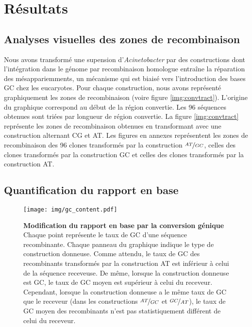 

\section{Résultats}
\label{sec:resultats}

\subsection{Analyses visuelles des zones de recombinaison}
\label{subsec:visu}

Nous avons transformé une supension d'\emph{Acinetobacter} par des constructions
dont l'intégration dans le génome par recombinaison homologue entraîne la
réparation des mésappariemments, un mécanisme qui est biaisé vers l'introduction
des bases GC chez les eucaryotes. Pour chaque construction, nous avons
représenté graphiquement les zones de recombinaison (voire figure
\ref{img:convtract}). L'origine du graphique correspond au début de la région
convertie. Les 96 séquences obtenues sont triées par longueur de région
convertie. La figure \ref{img:convtract} représente les zones de recombinaison
obtenues en transformant avec une construction alternant CG et AT. Les figures
en annexes
représentent les zones de recombinaison des 96 clones transformés par la
construction \(\nicefrac{AT}{GC}\), celles des clones transformés par la
construction GC et celles des clones transformés par la construction AT.


\subsection{Quantification du rapport en base}
\label{subsec:tauxgc}

\begin{figure}
  \texttt{[image: img/gc\_content.pdf]}

  \caption{\textbf{Modification du rapport en base par la
      conversion génique} \\
    Chaque point représente le taux de GC d'une séquence recombinante. Chaque
    panneau du graphique indique le type de construction donneuse. Comme
    attendu, le taux de GC des recombinants transformés par la construction AT
    est inférieur à celui de la séquence receveuse. De même, lorsque la
    construction donneuse est GC, le taux de GC moyen est supérieur à celui du
    receveur. Cependant, lorsque la construction donneuse a le même taux de GC
    que le receveur (dans les constructions $\nicefrac{AT}{GC}$ et
    $\nicefrac{GC}{AT}$), le taux de GC moyen des recombinants n'est pas
    statistiquement différent de celui du receveur. }\label{fig:tauxgc}

\end{figure}
